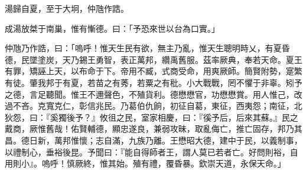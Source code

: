
\begin{pinyinscope}
湯歸自夏，至于大坰，仲虺作誥。

成湯放桀于南巢，惟有慚德。曰：「予恐來世以台為口實。」

仲虺乃作誥，曰：「嗚呼！惟天生民有欲，無主乃亂，惟天生聰明時乂，有夏昏德，民墜塗炭，天乃錫王勇智，表正萬邦，纘禹舊服。茲率厥典，奉若天命。夏王有罪，矯誣上天，以布命于下。帝用不臧，式商受命，用爽厥師。簡賢附勢，寔繁有徒。肇我邦于有夏，若苗之有莠，若粟之有秕。小大戰戰，罔不懼于非辜。矧予之德，言足聽聞。惟王不邇聲色，不殖貨利。德懋懋官，功懋懋賞。用人惟己，改過不吝。克寬克仁，彰信兆民。乃葛伯仇餉，初征自葛，東征，西夷怨；南征，北狄怨，曰：『奚獨後予？』攸徂之民，室家相慶，曰：『徯予后，后來其蘇。』民之戴商，厥惟舊哉！佑賢輔德，顯忠遂良，兼弱攻昧，取亂侮亡，推亡固存，邦乃其昌。德日新，萬邦惟懷；志自滿，九族乃離。王懋昭大德，建中于民，以義制事，以禮制心，垂裕後昆。予聞曰：『能自得師者王，謂人莫已若者亡。好問則裕，自用則小』。嗚呼！慎厥終，惟其始。殖有禮，覆昏暴。欽崇天道，永保天命。」


\end{pinyinscope}